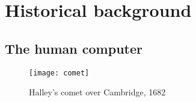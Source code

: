 
\chapter{Historical background} %

\label{Chapter01} %




\section{The human computer}

\begin{figure}[ht]
    \centering
    \texttt{[image: comet]}
    \caption{Halley's comet over Cambridge, 1682\cite{grier2010}}
    \label{fig:comet}
\end{figure}

